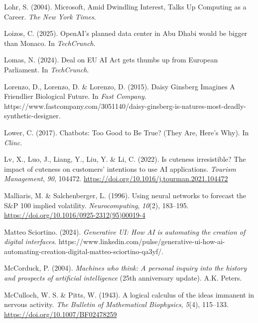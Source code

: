 \documentclass[
  letterpaper,
  DIV=11,
  numbers=noendperiod]{scrartcl}
\newlength{\cslhangindent}
\newenvironment{CSLReferences}[2] %
 {\begin{list}{}{%
  \setlength{\itemindent}{0pt}
  \setlength{\leftmargin}{0pt}
  \setlength{\parsep}{0pt}
  \ifodd #1
   \setlength{\leftmargin}{\cslhangindent}
   \setlength{\itemindent}{-1\cslhangindent}
  \fi
  \setlength{\itemsep}{#2\baselineskip}}}
 {\end{list}}
\begin{document}
\begin{CSLReferences}{1}{0}
Lohr, S. (2004). Microsoft, {Amid Dwindling Interest}, {Talks Up
Computing} as a {Career}. \emph{The New York Times}.

Loizos, C. (2025). {OpenAI}'s planned data center in {Abu Dhabi} would
be bigger than {Monaco}. In \emph{TechCrunch}.

Lomas, N. (2024). Deal on {EU AI Act} gets thumbs up from {European
Parliament}. In \emph{TechCrunch}.

Lorenzo, D., Lorenzo, D. \& Lorenzo, D. (2015). Daisy {Ginsberg Imagines
A Friendlier Biological Future}. In \emph{Fast Company}.
https://www.fastcompany.com/3051140/daisy-ginsberg-is-natures-most-deadly-synthetic-designer.

Lower, C. (2017). Chatbots: {Too Good} to {Be True}? ({They Are},
{Here}'s {Why}). In \emph{Clinc}.

Lv, X., Luo, J., Liang, Y., Liu, Y. \& Li, C. (2022). Is cuteness
irresistible? {The} impact of cuteness on customers' intentions to use
{AI} applications. \emph{Tourism Management}, \emph{90}, 104472.
\url{https://doi.org/10.1016/j.tourman.2021.104472}

Malliaris, M. \& Salchenberger, L. (1996). Using neural networks to
forecast the {S}\&{P} 100 implied volatility. \emph{Neurocomputing},
\emph{10}(2), 183--195.
\url{https://doi.org/10.1016/0925-2312(95)00019-4}

Matteo Sciortino. (2024). \emph{Generative {UI}: How {AI} is automating
the creation of digital interfaces}.
https://www.linkedin.com/pulse/generative-ui-how-ai-automating-creation-digital-matteo-sciortino-qa3yf/.

McCorduck, P. (2004). \emph{Machines who think: A personal inquiry into
the history and prospects of artificial intelligence} (25th anniversary
update). A.K. Peters.

McCulloch, W. S. \& Pitts, W. (1943). A logical calculus of the ideas
immanent in nervous activity. \emph{The Bulletin of Mathematical
Biophysics}, \emph{5}(4), 115--133.
\url{https://doi.org/10.1007/BF02478259}


\end{CSLReferences}
\end{document}
